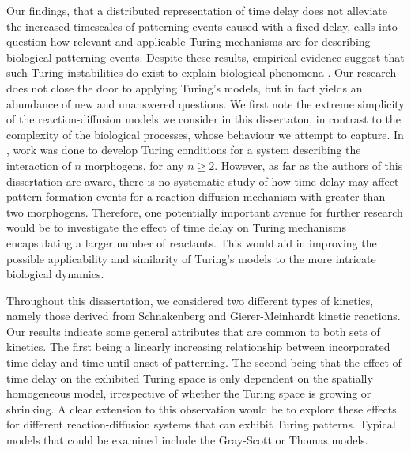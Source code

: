 Our findings, that a distributed representation of time delay does not alleviate the increased timescales of patterning events caused with a fixed delay, calls into question how relevant and applicable Turing mechanisms are for describing biological patterning events. Despite these results, empirical evidence suggest that such Turing instabilities do exist to explain biological phenomena \cite{yigaffneyli,molecular,miura,miura2,sick}. Our research does not close the door to applying Turing's models, but in fact yields an abundance of new and unanswered questions. We first note the extreme simplicity of the reaction-diffusion models we consider in this dissertaton, in contrast to the complexity of the biological processes, whose behaviour we attempt to capture. In \cite{mainigeneral}, work was done to develop Turing conditions for a system describing the interaction of $n$ morphogens, for any $n\geq2$. However, as far as the authors of this dissertation are aware, there is no systematic study of how time delay may affect pattern formation events for a reaction-diffusion mechanism with greater than two morphogens. Therefore, one potentially important avenue for further research would be to investigate the effect of time delay on Turing mechanisms encapsulating a larger number of reactants. This would aid in improving the possible applicability and similarity of Turing's models to the more intricate biological dynamics.

Throughout this disssertation, we considered two different types of kinetics, namely those derived from Schnakenberg and Gierer-Meinhardt kinetic reactions. Our results indicate some general attributes that are common to both sets of kinetics. The first being a linearly increasing relationship between incorporated time delay and time until onset of patterning. The second being that the effect of time delay on the exhibited Turing space is only dependent on the spatially homogeneous model, irrespective of whether the Turing space is growing or shrinking. A clear extension to this observation would be to explore these effects for different reaction-diffusion systems that can exhibit Turing patterns. Typical models that could be examined include the Gray-Scott \cite{grayscott} or Thomas \cite{murray} models.

